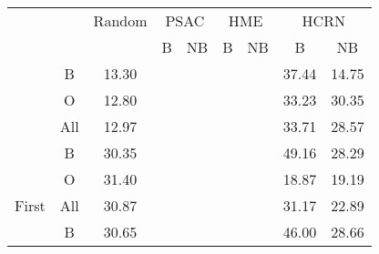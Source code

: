 \begin{tabular}{cccllllcc}
\multicolumn{1}{l}{}                              & \multicolumn{1}{l}{} & Random                                            & \multicolumn{2}{c}{PSAC}                       & \multicolumn{2}{c}{HME}                        & \multicolumn{2}{c}{HCRN} \\
\multicolumn{1}{l}{}                              & \multicolumn{1}{l}{} & \multicolumn{1}{l}{}                              & \multicolumn{1}{c}{B} & \multicolumn{1}{c}{NB} & \multicolumn{1}{c}{B} & \multicolumn{1}{c}{NB} & B           & NB         \\
\rowcolor[HTML]{F3F3F3} 
\cellcolor[HTML]{F3F3F3}                          & B                    & 13.30                                             &                       &                        &                       &                        & 37.44       & 14.75      \\
\rowcolor[HTML]{F3F3F3} 
\cellcolor[HTML]{F3F3F3}                          & O                    & 12.80                                             &                       &                        &                       &                        & 33.23       & 30.35      \\
\rowcolor[HTML]{F3F3F3} 
\multirow{-3}{*}{\cellcolor[HTML]{F3F3F3}What}    & All                  & 12.97                                             &                       &                        &                       &                        & 33.71       & 28.57      \\
                                                  & B                    & 30.35                                             &                       &                        &                       &                        & 49.16       & 28.29      \\
                                                  & O                    & 31.40                                             &                       &                        &                       &                        & 18.87       & 19.19      \\
\multirow{-3}{*}{First}                           & All                  & 30.87                                             &                       &                        &                       &                        & 31.17       & 22.89      \\
\rowcolor[HTML]{F3F3F3} 
\cellcolor[HTML]{F3F3F3}                          & B                    & 30.65                                             &                       &                        &                       &                        & 46.00       & 28.66      \\

\end{tabular}
